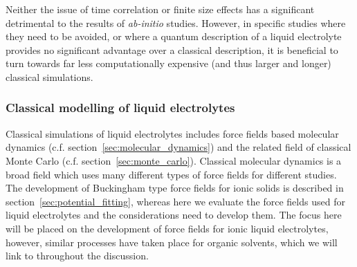 \documentclass[../main.tex]{subfiles}
\begin{document}
Neither the issue of time correlation or finite size effects has a significant detrimental to the results of \textit{ab-initio} studies. However, in specific studies where they need to be avoided, or where a quantum description of a liquid electrolyte provides no significant advantage over a classical description, it is beneficial to turn towards far less computationally expensive (and thus larger and longer) classical simulations.

\subsubsection{Classical modelling of liquid electrolytes}

Classical simulations of liquid electrolytes includes force fields based molecular dynamics (c.f. section~\ref{sec:molecular_dynamics}) and the related field of classical Monte Carlo (c.f. section~\ref{sec:monte_carlo}). %
Classical molecular dynamics is a broad field which uses many different types of force fields for different studies. The development of Buckingham type force fields for ionic solids is described in section~\ref{sec:potential_fitting}, whereas here we evaluate the force fields used for liquid electrolytes and the considerations need to develop them. The focus here will be placed on the development of force fields for ionic liquid electrolytes, however, similar processes have taken place for organic solvents, which we will link to throughout the discussion.
\end{document}
